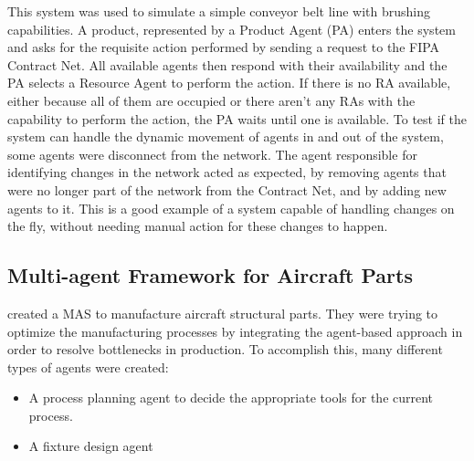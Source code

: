 This system was used to simulate a simple conveyor belt line with brushing capabilities. A product, represented by a Product Agent (PA) enters the system and asks for the requisite action performed by sending a request to the FIPA Contract Net. All available agents then respond with their availability and the PA selects a Resource Agent to perform the action. If there is no RA available, either because all of them are occupied or there aren't any RAs with the capability to perform the action, the PA waits until one is available.
To test if the system can handle the dynamic movement of agents in and out of the system, some agents were disconnect from the network. The agent responsible for identifying changes in the network acted as expected, by removing agents that were no longer part of the network from the Contract Net, and by adding new agents to it.
This is a good example of a system capable of handling changes on the fly, without needing manual action for these changes to happen.

\subsection{Multi-agent Framework for Aircraft Parts}

\citeauthor{6221793} \cite{6221793} created a MAS to manufacture aircraft structural parts. They were trying to optimize the manufacturing processes by integrating the agent-based approach in order to resolve bottlenecks in production. To accomplish this, many different types of agents were created:

\begin{itemize}
	\item A process planning agent to decide the appropriate tools for the current process.
	\item A fixture design agent 
\end{itemize}